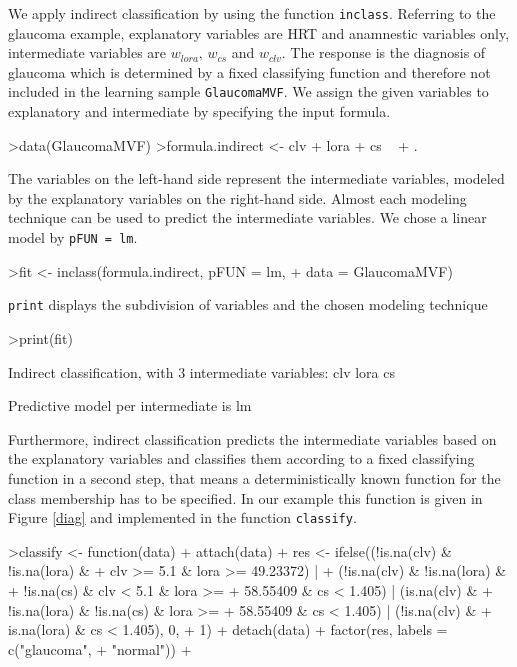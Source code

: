 \documentclass[11pt]{article}
\begin{document}
We apply indirect classification by using the function \texttt{inclass}.
Referring to the glaucoma example, explanatory variables are HRT 
and anamnestic variables only, intermediate variables 
are $w_{lora}, \, w_{cs}$ and $w_{clv}$. The response is the 
diagnosis of glaucoma which is determined by a fixed classifying 
function and therefore not included in the learning 
sample \texttt{GlaucomaMVF}. We assign the given variables to explanatory 
and intermediate by specifying the input formula.
\begin{Schunk}
\begin{Sinput}
>data(GlaucomaMVF)
>formula.indirect <- clv + lora + cs ~ 
+     .
\end{Sinput}
\end{Schunk}
The variables on the left-hand side represent the intermediate variables, 
modeled by the explanatory variables on the right-hand side. Almost each 
modeling technique can be used to predict the intermediate variables. We 
chose a linear model by \texttt{pFUN = lm}.
\begin{Schunk}
\begin{Sinput}
>fit <- inclass(formula.indirect, pFUN = lm, 
+     data = GlaucomaMVF)
\end{Sinput}
\end{Schunk}
\texttt{print} displays the subdivision of variables and the chosen 
modeling technique
\begin{Schunk}
\begin{Sinput}
>print(fit)
\end{Sinput}
\begin{Soutput}
 Indirect classification, with 3 intermediate variables: 
 clv lora cs 
 
 Predictive model per intermediate is lm 
\end{Soutput}
\end{Schunk}
Furthermore, indirect classification predicts the intermediate 
variables based on the explanatory variables and classifies them 
according to a fixed classifying function in a second step, that means 
a deterministically known function for the class membership has to be 
specified. In our example this function is given in 
Figure \ref{diag} and implemented in the function \texttt{classify}.
\begin{Schunk}
\begin{Sinput}
>classify <- function(data) {
+     attach(data)
+     res <- ifelse((!is.na(clv) & !is.na(lora) & 
+         clv >= 5.1 & lora >= 49.23372) | 
+         (!is.na(clv) & !is.na(lora) & 
+             !is.na(cs) & clv < 5.1 & lora >= 
+             58.55409 & cs < 1.405) | (is.na(clv) & 
+         !is.na(lora) & !is.na(cs) & lora >= 
+         58.55409 & cs < 1.405) | (!is.na(clv) & 
+         is.na(lora) & cs < 1.405), 0, 
+         1)
+     detach(data)
+     factor(res, labels = c("glaucoma", 
+         "normal"))
+ }
\end{Sinput}
\end{Schunk}
\end{document}
